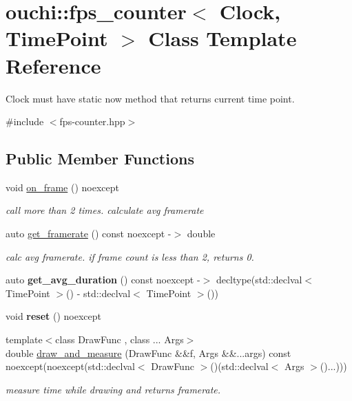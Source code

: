 \hypertarget{classouchi_1_1fps__counter}{}\section{ouchi\+::fps\+\_\+counter$<$ Clock, Time\+Point $>$ Class Template Reference}
\label{classouchi_1_1fps__counter}


Clock must have static {\ttfamily now} method that returns current time point.  




{\ttfamily \#include $<$fps-\/counter.\+hpp$>$}

\subsection*{Public Member Functions}
\begin{DoxyCompactItemize}
\item 
void \mbox{\hyperlink{classouchi_1_1fps__counter_a0a7766cd31f0ed5d07bfcb316244673f}{on\+\_\+frame}} () noexcept
\begin{DoxyCompactList}\small\item\em call more than 2 times. calculate avg framerate \end{DoxyCompactList}\item 
auto \mbox{\hyperlink{classouchi_1_1fps__counter_a79b6ffdb6f8d8ef73f019f704e4ed901}{get\+\_\+framerate}} () const noexcept -\/$>$ double
\begin{DoxyCompactList}\small\item\em calc avg framerate. if frame count is less than 2, returns 0. \end{DoxyCompactList}\item 
\mbox{\label{classouchi_1_1fps__counter_ac5af84f34a6d37614c38b037bfa7b531}} 
auto {\bfseries get\+\_\+avg\+\_\+duration} () const noexcept -\/$>$ decltype(std\+::declval$<$ Time\+Point $>$() -\/ std\+::declval$<$ Time\+Point $>$())
\item 
\mbox{\label{classouchi_1_1fps__counter_aa999db83b4f5601918202ab6326864e1}} 
void {\bfseries reset} () noexcept
\item 
{\footnotesize template$<$class Draw\+Func , class ... Args$>$ }\\double \mbox{\hyperlink{classouchi_1_1fps__counter_adf100b1873b9aebb2da2b0240f9d743a}{draw\+\_\+and\+\_\+measure}} (Draw\+Func \&\&f, Args \&\&...args) const noexcept(noexcept(std\+::declval$<$ Draw\+Func $>$()(std\+::declval$<$ Args $>$()...)))
\begin{DoxyCompactList}\small\item\em measure time while drawing and returns framerate. \end{DoxyCompactList}\end{DoxyCompactItemize}


